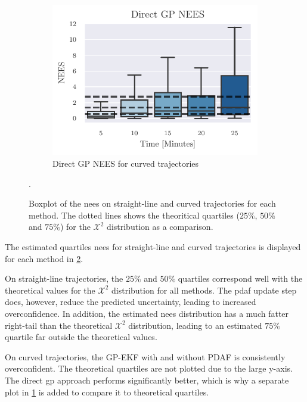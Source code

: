 \begin{figure}
\begin{subfigure}{0.65\textwidth}
        \includegraphics{figures/curved_line_stats/direct_gp_nees.pdf}
        \caption{Direct GP NEES for curved trajectories}
        \label{fig:stats_curved_nees_direct}
    \end{subfigure}
    \caption{Boxplot of the \acrshort{nees} on straight-line and curved trajectories for each method. The dotted lines shows the theoritical quartiles ($25\%$, $50\%$ and $75\%$) for the $\mathcal{X}^2$ distribution as a comparison.}.
    \label{fig:stats_curved_nees}
\end{figure}
The estimated quartiles \acrshort{nees} for straight-line and curved trajectories is displayed for each method in \cref{fig:stats_curved_nees}.

On straight-line trajectories, the $25\%$ and $50\%$ quartiles correspond well with the theoretical values for the $\mathcal{X}^2$ distribution for all methods. The \acrshort{pdaf} update step does, however, reduce the predicted uncertainty, leading to increased overconfidence. In addition, the estimated \acrshort{nees} distribution has a much fatter right-tail than the theoretical $\mathcal{X}^2$ distribution, leading to an estimated $75\%$ quartile far outside the theoretical values.

On curved trajectories, the GP-EKF with and without PDAF is consistently overconfident. The theoretical quartiles are not plotted due to the large y-axis. The direct \acrshort{gp} approach performs significantly better, which is why a separate plot in \cref{fig:stats_curved_nees_direct} is added to compare it to theoretical quartiles.




